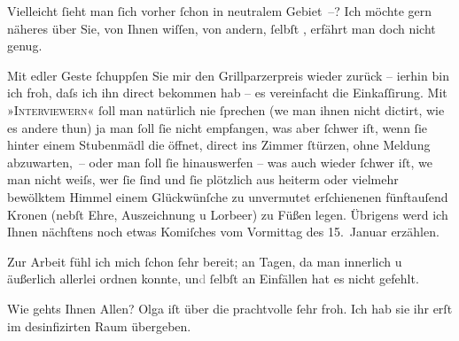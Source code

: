 \pstart
           {\pb}Vielleicht{ }ſieht man{ }ſich vorher{ }ſchon in neutralem
               Gebiet –? Ich möchte gern näheres über Sie, von Ihnen wiſſen, von andern,{ }ſelbſt
                  \label{K_L01758-2v}\label{K_L01758-2},
               erfährt man doch nicht genug.\pend
           
\pstart
           Mit edler Geste{ }ſchuppſen Sie mir den Grillparzerpreis wieder zurück – i{\geminationm}erhin bin
               ich froh, daſs ich ihn direct bekommen hab – es vereinfacht die Einkaſſirung. Mit
                  »\textsc{Interviewern}«{ }ſoll man natürlich nie{ }ſprechen (we{\geminationn} man ihnen
               nicht dictirt, wie es andere thun) {\pb}ja man{ }ſoll{ }ſie nicht
               empfangen, was aber{ }ſchwer iſt, wenn{ }ſie hinter einem Stubenmädl die öffnet, direct
               ins Zimmer{ }ſtürzen, ohne Meldung abzuwarten, – oder man{ }ſoll{ }ſie hinauswerfen – was
               auch wieder{ }ſchwer iſt, we{\geminationn} man nicht weiſs, wer{ }ſie{ }ſind und{ }ſie plötzlich aus heiterm oder vielmehr bewölktem Himmel einem Glückwünſche
               zu unvermutet erſchienenen fünftauſend Kronen (nebſt Ehre, Auszeichnung u Lorbeer) zu
               Füßen legen. Übrigens werd ich Ihnen {\pb}nächſtens noch
               etwas Komiſches vom Vormittag des 15. Januar erzählen.\pend
           
\pstart
           Zur Arbeit fühl ich mich{ }ſchon{ }ſehr bereit; an Tagen, da man innerlich u äußerlich
               allerlei ordnen konnte, un\textcolor{gray}{d}{ }ſelbſt an Einfällen hat es  nicht gefehlt.\pend
           
\pstart
           Wie gehts Ihnen Allen? Olga iſt über die
               prachtvolle \label{K_L01758-3v}\label{K_L01758-3}{ }ſehr froh. Ich hab sie \introOben{}ihr\introOben{}
               erſt im desinfizirten Raum übergeben.\pend
           
